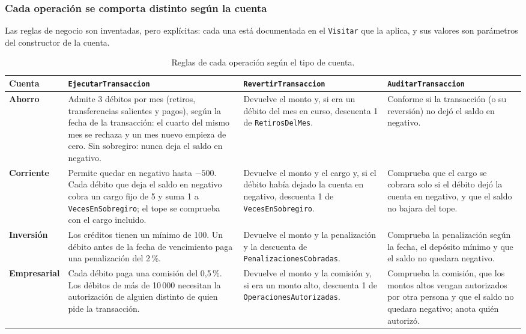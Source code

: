 \subsubsection{Cada operación se comporta distinto según la cuenta}

Las reglas de negocio son inventadas, pero explícitas: cada una está documentada en el
\texttt{Visitar} que la aplica, y sus valores son parámetros del constructor de la cuenta.

\begin{table}[H]
\centering
\footnotesize
\begin{tabularx}{\textwidth}{>{\raggedright\arraybackslash}p{2.1cm}
                             >{\raggedright\arraybackslash}X
                             >{\raggedright\arraybackslash}X
                             >{\raggedright\arraybackslash}X}
\toprule
\textbf{Cuenta} & \textbf{\texttt{EjecutarTransaccion}} & \textbf{\texttt{RevertirTransaccion}}
  & \textbf{\texttt{AuditarTransaccion}} \\
\midrule
\textbf{Ahorro}
  & Admite 3 débitos por mes (retiros, transferencias salientes y pagos), según la fecha de
    la transacción: el cuarto del mismo mes se rechaza y un mes nuevo empieza de cero. Sin
    sobregiro: nunca deja el saldo en negativo.
  & Devuelve el monto y, si era un débito del mes en curso, descuenta 1 de
    \texttt{RetirosDelMes}.
  & Conforme si la transacción (o su reversión) no dejó el saldo en negativo. \\
\addlinespace
\textbf{Corriente}
  & Permite quedar en negativo hasta $-500$. Cada débito que deja el saldo en negativo cobra
    un cargo fijo de 5 y suma 1 a \texttt{VecesEnSobregiro}; el tope se comprueba con el cargo
    incluido.
  & Devuelve el monto y el cargo y, si el débito había dejado la cuenta en negativo,
    descuenta 1 de \texttt{VecesEnSobregiro}.
  & Comprueba que el cargo se cobrara solo si el débito dejó la cuenta en negativo, y que el
    saldo no bajara del tope. \\
\addlinespace
\textbf{Inversión}
  & Los créditos tienen un mínimo de 100. Un débito antes de la fecha de vencimiento paga
    una penalización del 2\,\%.
  & Devuelve el monto y la penalización y la descuenta de
    \texttt{PenalizacionesCobradas}.
  & Comprueba la penalización según la fecha, el depósito mínimo y que el saldo no quedara
    negativo. \\
\addlinespace
\textbf{Empresarial}
  & Cada débito paga una comisión del 0,5\,\%. Los débitos de más de 10\,000 necesitan la
    autorización de alguien distinto de quien pide la transacción.
  & Devuelve el monto y la comisión y, si era un monto alto, descuenta 1 de
    \texttt{OperacionesAutorizadas}.
  & Comprueba la comisión, que los montos altos vengan autorizados por otra persona y que el
    saldo no quedara negativo; anota quién autorizó. \\
\bottomrule
\end{tabularx}
\caption{Reglas de cada operación según el tipo de cuenta.}
\end{table}


